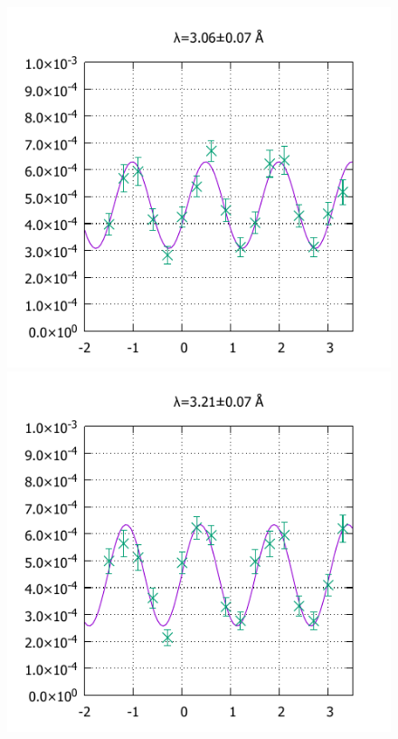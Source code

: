 \begin{figure}[H]
\centering
\begin{minipage}{0.33\hsize}
\includegraphics[width=\imgwidth]{phase_shifter/wl/wlf1.pdf}
\end{minipage}
\begin{minipage}{0.33\hsize}
\includegraphics[width=\imgwidth]{phase_shifter/wl/wlf2.pdf}
\end{minipage}

\end{figure}
